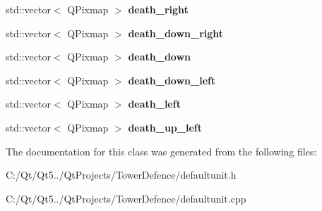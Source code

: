 \begin{DoxyCompactItemize}
\item 
\hypertarget{class_default_unit_a38e890f7d26e42336c8ed10f3dc24dcf}{}std\+::vector$<$ Q\+Pixmap $>$ {\bfseries death\+\_\+right}\label{class_default_unit_a38e890f7d26e42336c8ed10f3dc24dcf}

\item 
\hypertarget{class_default_unit_a19db0dba4765e7259cf59f7a5bd27b8f}{}std\+::vector$<$ Q\+Pixmap $>$ {\bfseries death\+\_\+down\+\_\+right}\label{class_default_unit_a19db0dba4765e7259cf59f7a5bd27b8f}

\item 
\hypertarget{class_default_unit_a3706fa4a34cbfbda455ad7c3d75a50fe}{}std\+::vector$<$ Q\+Pixmap $>$ {\bfseries death\+\_\+down}\label{class_default_unit_a3706fa4a34cbfbda455ad7c3d75a50fe}

\item 
\hypertarget{class_default_unit_a5ded5d9418c76cb85206efaba62898c3}{}std\+::vector$<$ Q\+Pixmap $>$ {\bfseries death\+\_\+down\+\_\+left}\label{class_default_unit_a5ded5d9418c76cb85206efaba62898c3}

\item 
\hypertarget{class_default_unit_af4c1e7f4738637f59d810dd0c1339600}{}std\+::vector$<$ Q\+Pixmap $>$ {\bfseries death\+\_\+left}\label{class_default_unit_af4c1e7f4738637f59d810dd0c1339600}

\item 
\hypertarget{class_default_unit_abaee1c16431c28a9a56a8f90e8250a83}{}std\+::vector$<$ Q\+Pixmap $>$ {\bfseries death\+\_\+up\+\_\+left}\label{class_default_unit_abaee1c16431c28a9a56a8f90e8250a83}

\end{DoxyCompactItemize}


The documentation for this class was generated from the following files\+:\begin{DoxyCompactItemize}
\item 
C\+:/\+Qt/\+Qt5../\+Qt\+Projects/\+Tower\+Defence/defaultunit.\+h\item 
C\+:/\+Qt/\+Qt5../\+Qt\+Projects/\+Tower\+Defence/defaultunit.\+cpp\end{DoxyCompactItemize}
